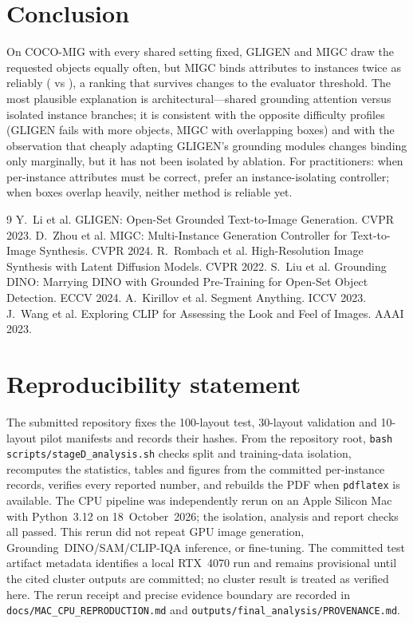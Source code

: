 \documentclass[10pt,twocolumn]{article}
\begin{document}
\section{Conclusion}
On COCO-MIG with every shared setting fixed, GLIGEN and MIGC draw the requested objects equally often, but MIGC binds attributes to instances twice as reliably (\AttrM{} vs \AttrG), a ranking that survives changes to the evaluator threshold. The most plausible explanation is architectural---shared grounding attention versus isolated instance branches; it is consistent with the opposite difficulty profiles (GLIGEN fails with more objects, MIGC with overlapping boxes) and with the observation that cheaply adapting GLIGEN's grounding modules changes binding only marginally, but it has not been isolated by ablation. For practitioners: when per-instance attributes must be correct, prefer an instance-isolating controller; when boxes overlap heavily, neither method is reliable yet.

\begin{thebibliography}{9}\small
{} Y.~Li et al. GLIGEN: Open-Set Grounded Text-to-Image Generation. CVPR 2023.
 D.~Zhou et al. MIGC: Multi-Instance Generation Controller for Text-to-Image Synthesis. CVPR 2024.
 R.~Rombach et al. High-Resolution Image Synthesis with Latent Diffusion Models. CVPR 2022.
 S.~Liu et al. Grounding DINO: Marrying DINO with Grounded Pre-Training for Open-Set Object Detection. ECCV 2024.
 A.~Kirillov et al. Segment Anything. ICCV 2023.
 J.~Wang et al. Exploring CLIP for Assessing the Look and Feel of Images. AAAI 2023.
\end{thebibliography}

\section*{Reproducibility statement}
The submitted repository fixes the 100-layout test, 30-layout validation and 10-layout pilot manifests and records their hashes. From the repository root, \texttt{bash scripts/stageD\_analysis.sh} checks split and training-data isolation, recomputes the statistics, tables and figures from the committed per-instance records, verifies every reported number, and rebuilds the PDF when \texttt{pdflatex} is available. The CPU pipeline was independently rerun on an Apple Silicon Mac with Python~3.12 on 18~October~2026; the isolation, analysis and report checks all passed. This rerun did not repeat GPU image generation, Grounding~DINO/SAM/CLIP-IQA inference, or fine-tuning. The committed test artifact metadata identifies a local RTX~4070 run and remains provisional until the cited cluster outputs are committed; no cluster result is treated as verified here. The rerun receipt and precise evidence boundary are recorded in \texttt{docs/MAC\_CPU\_REPRODUCTION.md} and \texttt{outputs/final\_analysis/PROVENANCE.md}.
\end{document}

